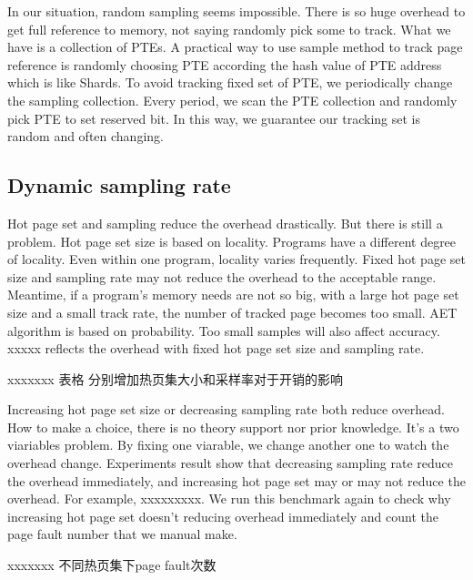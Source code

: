 \documentclass[10pt,twocolumn]{article}
\begin{document}
In our situation, random sampling seems impossible. There is so huge overhead to get full reference to memory, not saying randomly pick some to track. What we have is a collection of PTEs. A practical way to use sample method to track page reference is randomly choosing PTE according the hash value of PTE address which is like Shards. To avoid tracking fixed set of PTE, we periodically change the sampling collection. Every period, we scan the PTE collection and randomly pick PTE to set reserved bit. In this way, we guarantee our tracking set is random and often changing.

\subsection{Dynamic sampling rate}
Hot page set and sampling reduce the overhead drastically. But there is still a problem. Hot page set size is based on locality. Programs have a different degree of locality. Even within one program, locality varies frequently. Fixed hot page set size and sampling rate may not reduce the overhead to the acceptable range. Meantime, if a program's memory needs are not so big, with a large hot page set size and a small track rate, the number of tracked page becomes too small. AET algorithm is based on probability. Too small samples will also affect accuracy. xxxxx reflects the overhead with fixed hot page set size and sampling rate.

xxxxxxx 表格 分别增加热页集大小和采样率对于开销的影响

Increasing hot page set size or decreasing sampling rate both reduce overhead. How to make a choice, there is no theory support nor prior knowledge. It's a two viariables problem. By fixing one viarable, we change another one to watch the overhead change. Experiments result show that decreasing sampling rate reduce the overhead immediately, and increasing hot page set may or may not reduce the overhead. For example, xxxxxxxxx. We run this benchmark again to check why increasing hot page set doesn't reducing overhead immediately and count the page fault number that we manual make.

xxxxxxx 不同热页集下page fault次数
\end{document}

